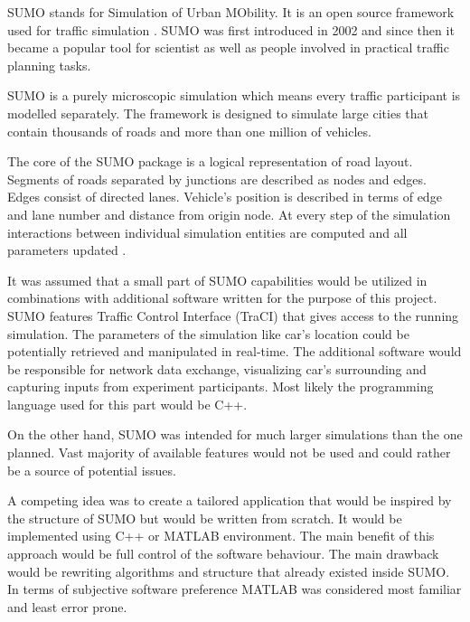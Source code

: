 \documentclass[11pt,english,twoside]{article}
\begin{document}

SUMO stands for Simulation of Urban MObility. It is an open source framework used for traffic simulation \citep{krajzewicz2002sumo}. SUMO was first introduced in 2002 and since then it became a popular tool for scientist as well as people involved in practical traffic planning tasks. 
\par
SUMO is a purely microscopic simulation which means every traffic participant is modelled separately. The framework is designed to simulate large cities that contain thousands of roads and more than one million of vehicles.
\par
The core of the SUMO package is a logical representation of road layout. Segments of roads separated by junctions are described as nodes and edges. Edges consist of directed lanes. Vehicle's position is described in terms of edge and lane number and distance from origin node. At every step of the simulation interactions between individual simulation entities are computed and all parameters updated 
\citep{krajzewicz2002sumo}.
\par

It was assumed that a small part of SUMO capabilities would be utilized in combinations with additional software written for the purpose of this project. SUMO features  Traffic Control Interface (TraCI) \citep{sumo2} that gives access to the running simulation. The parameters of the simulation like car's location could be potentially retrieved and manipulated in real-time. The additional software would be responsible for network data exchange, visualizing car's surrounding and capturing inputs from experiment participants. Most likely the programming language used for this part would be C++. 
\par
On the other hand, SUMO was intended for much larger simulations than the one planned. Vast majority of available features would not be used and could rather be a source of potential issues. 




\par


A competing idea was to create a tailored application that would be inspired by the structure of SUMO but would be written from scratch. It would be implemented using C++ or MATLAB environment. The main benefit of this approach would be full control of the software behaviour. The main drawback would be rewriting algorithms and structure that already existed inside SUMO. In terms of subjective software preference MATLAB was considered most familiar and least error prone.  
\end{document}
